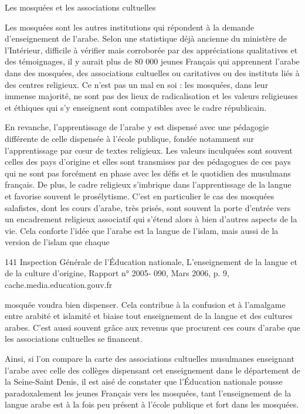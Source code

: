 Les mosquées et les associations cultuelles


Les mosquées sont les autres institutions qui répondent à la demande
d'enseignement de l'arabe. Selon une statistique déjà ancienne du
ministère de l'Intérieur, difficile à vérifier mais corroborée par des
appréciations qualitatives et des témoignages, il y aurait plus de 80
000 jeunes Français qui apprennent l'arabe dans des mosquées, des
associations cultuelles ou caritatives ou des instituts liés à des
centres religieux. Ce n'est pas un mal en soi : les mosquées, dans leur
immense majorité, ne sont pas des lieux de radicalisation et les valeurs
religieuses et éthiques qui s'y enseignent sont compatibles avec le
cadre républicain.

En revanche, l'apprentissage de l'arabe y est dispensé avec une
pédagogie différente de celle dispensée à l'école publique, fondée
notamment sur l'apprentissage par cœur de textes religieux. Les valeurs
inculquées sont souvent celles des pays d'origine et elles sont
transmises par des pédagogues de ces pays qui ne sont pas forcément en
phase avec les défis et le quotidien des musulmans français. De plus, le
cadre religieux s'imbrique dans l'apprentissage de la langue et favorise
souvent le prosélytisme. C'est en particulier le cas des mosquées
salafistes, dont les cours d'arabe, très prisés, sont souvent la porte
d'entrée vers un encadrement religieux associatif qui s'étend alors à
bien d'autres aspects de la vie. Cela conforte l'idée que l'arabe est la
langue de l'islam, mais aussi de la version de l'islam que chaque

141 Inspection Générale de l'Éducation nationale, L'enseignement de la
langue et de la culture d'origine, Rapport n° 2005- 090, Mars 2006, p.
9, cache.media.education.gouv.fr



mosquée voudra bien dispenser. Cela contribue à la confusion et à
l'amalgame entre arabité et islamité et biaise tout enseignement de la
langue et des cultures arabes. C'est aussi souvent grâce aux revenus que
procurent ces cours d'arabe que les associations cultuelles se
financent.

Ainsi, si l'on compare la carte des associations cultuelles musulmanes
enseignant l'arabe avec celle des collèges dispensant cet enseignement
dans le département de la Seine-Saint Denis, il est aisé de constater
que l'Éducation nationale pousse paradoxalement les jeunes Français vers
les mosquées, tant l'enseignement de la langue arabe est à la fois peu
présent à l'école publique et fort dans les mosquées.


